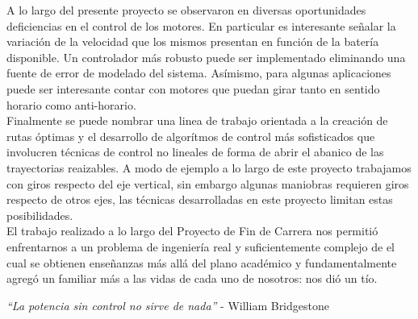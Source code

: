 \documentclass[main]{subfiles}
\begin{document}
A lo largo del presente proyecto se observaron en diversas oportunidades deficiencias en el control de los motores. En particular es interesante señalar la variaci\'on de la velocidad que los mismos presentan en funci\'on de la bater\'ia disponible. Un controlador m\'as robusto puede ser implementado eliminando una fuente de error de modelado del sistema. As\'imismo, para algunas aplicaciones puede ser interesante contar con motores que puedan girar tanto en sentido horario como anti-horario.\\

Finalmente se puede nombrar una linea de trabajo orientada a la creaci\'on de rutas \'optimas y el desarrollo de algor\'itmos de control m\'as sofisticados que involucren t\'ecnicas de control no lineales de forma de abrir el abanico de las trayectorias reaizables. A modo de ejemplo a lo largo de este proyecto trabajamos con giros respecto del eje vertical, sin embargo algunas maniobras requieren giros respecto de otros ejes, las t\'ecnicas desarrolladas en este proyecto limitan estas posibilidades.\\

El trabajo realizado a lo largo del Proyecto de Fin de Carrera nos permiti\'o enfrentarnos a un problema de ingenier\'ia real y suficientemente complejo de el cual se obtienen enseñanzas m\'as all\'a del plano acad\'emico y fundamentalmente agreg\'o un familiar m\'as a las vidas de cada uno de nosotros: nos di\'o un t\'io.

\emph{``La potencia sin control no sirve de nada''} - William Bridgestone
\end{document}
